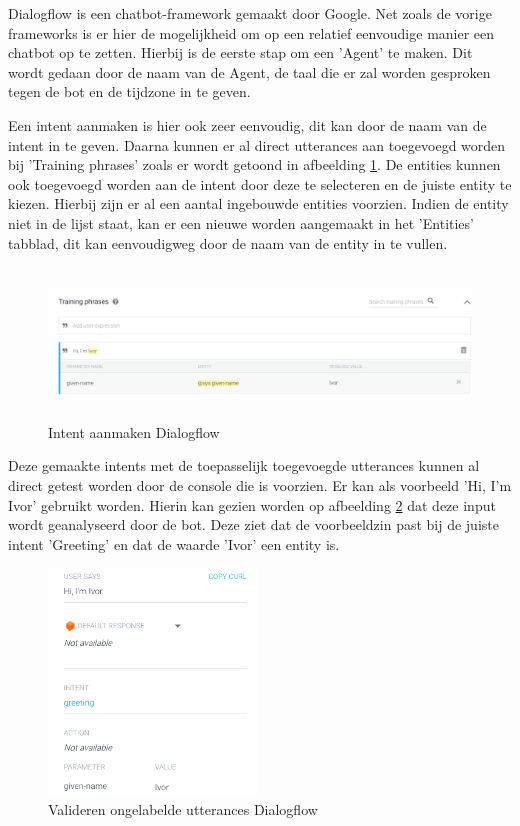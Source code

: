 Dialogflow is een chatbot-framework gemaakt door Google. Net zoals de vorige frameworks is er hier de mogelijkheid om op een relatief eenvoudige manier een chatbot op te zetten. Hierbij is de eerste stap om een 'Agent' te maken. Dit wordt gedaan door de naam van de Agent, de taal die er zal worden gesproken tegen de bot en de tijdzone in te geven.

Een intent aanmaken is hier ook zeer eenvoudig, dit kan door de naam van de intent in te geven. Daarna kunnen er al direct utterances aan toegevoegd worden bij 'Training phrases' zoals er wordt getoond in afbeelding \ref{fig:intentsdialogflow}. De entities kunnen ook toegevoegd worden aan de intent door deze te selecteren en de juiste entity te kiezen. Hierbij zijn er al een aantal ingebouwde entities voorzien. Indien de entity niet in de lijst staat, kan er een nieuwe worden aangemaakt in het 'Entities' tabblad, dit kan eenvoudigweg door de naam van de entity in te vullen.

\begin{figure}[h!]
	\centering
	\includegraphics[height=4cm]{img/dialogflow_intents.png}
	\caption{Intent aanmaken Dialogflow}
	\label{fig:intentsdialogflow}
\end{figure}

Deze gemaakte intents met de toepasselijk toegevoegde utterances kunnen al direct getest worden door de console die is voorzien. Er kan als voorbeeld 'Hi, I'm Ivor' gebruikt worden. Hierin kan gezien worden op afbeelding \ref{fig:testdialogflow} dat deze input wordt geanalyseerd door de bot. Deze ziet dat de voorbeeldzin past bij de juiste intent 'Greeting' en dat de waarde 'Ivor' een entity is.

\begin{figure}[h!]
	\centering
	\includegraphics[height=6cm]{img/dia_test.png}
	\caption{Valideren ongelabelde utterances Dialogflow}
	\label{fig:testdialogflow}
\end{figure}

